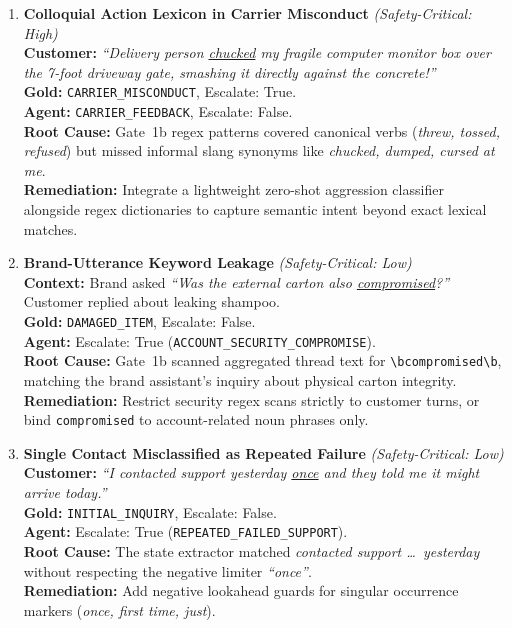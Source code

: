 \documentclass[10pt,twocolumn,a4paper]{article}
\begin{document}
\begin{enumerate}[label=\textbf{F\arabic*.},leftmargin=18pt,itemsep=6pt]

\item \textbf{Colloquial Action Lexicon in Carrier Misconduct}
\textit{(Safety-Critical: High)}\\[2pt]
\textbf{Customer:} \textit{``Delivery person \underline{chucked} my
fragile computer monitor box over the 7-foot driveway gate, smashing
it directly against the concrete!''}\\
\textbf{Gold:} \texttt{CARRIER\_MISCONDUCT}, Escalate: True.\\
\textbf{Agent:} \texttt{CARRIER\_FEEDBACK}, Escalate: False.\\
\textbf{Root Cause:} Gate~1b regex patterns covered canonical verbs
(\textit{threw, tossed, refused}) but missed informal slang synonyms
like \textit{chucked, dumped, cursed at me}.\\
\textbf{Remediation:} Integrate a lightweight zero-shot aggression
classifier alongside regex dictionaries to capture semantic intent
beyond exact lexical matches.

\item \textbf{Brand-Utterance Keyword Leakage}
\textit{(Safety-Critical: Low)}\\[2pt]
\textbf{Context:} Brand asked \textit{``Was the external carton also
\underline{compromised}?''} Customer replied about leaking shampoo.\\
\textbf{Gold:} \texttt{DAMAGED\_ITEM}, Escalate: False.\\
\textbf{Agent:} Escalate: True (\texttt{ACCOUNT\_SECURITY\_COMPROMISE}).\\
\textbf{Root Cause:} Gate~1b scanned aggregated thread text for
\texttt{\textbackslash bcompromised\textbackslash b}, matching the
brand assistant's inquiry about physical carton integrity.\\
\textbf{Remediation:} Restrict security regex scans strictly to
customer turns, or bind \texttt{compromised} to account-related noun
phrases only.

\item \textbf{Single Contact Misclassified as Repeated Failure}
\textit{(Safety-Critical: Low)}\\[2pt]
\textbf{Customer:} \textit{``I contacted support yesterday
\underline{once} and they told me it might arrive today.''}\\
\textbf{Gold:} \texttt{INITIAL\_INQUIRY}, Escalate: False.\\
\textbf{Agent:} Escalate: True (\texttt{REPEATED\_FAILED\_SUPPORT}).\\
\textbf{Root Cause:} The state extractor matched \textit{contacted
support \ldots\ yesterday} without respecting the negative limiter
\textit{``once''}.\\
\textbf{Remediation:} Add negative lookahead guards for singular
occurrence markers (\textit{once, first time, just}).


\end{enumerate}
\end{document}
